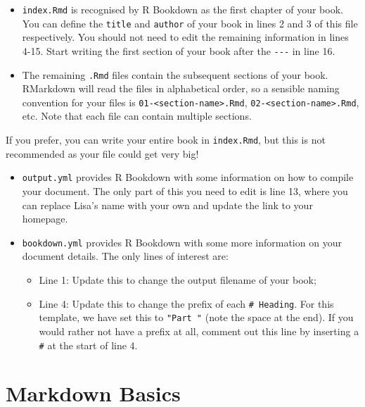 \documentclass[
  letterpaper,
  oneside]{book}
\providecommand{\tightlist}{%
  \setlength{\itemsep}{0pt}\setlength{\parskip}{0pt}}\usepackage{longtable,booktabs,array}
\numberwithin{equation}{section}
\numberwithin{figure}{section}
\theoremstyle{break}
\theoremstyle{plain}
\theoremstyle{remark}
\begin{document}
\begin{itemize}
\item
  \texttt{index.Rmd} is recognised by R Bookdown as the first chapter of
  your book. You can define the \texttt{title} and \texttt{author} of
  your book in lines 2 and 3 of this file respectively. You should not
  need to edit the remaining information in lines 4-15. Start writing
  the first section of your book after the \texttt{-\/-\/-} in line 16.
\item
  The remaining \texttt{.Rmd} files contain the subsequent sections of
  your book. RMarkdown will read the files in alphabetical order, so a
  sensible naming convention for your files is
  \texttt{01-\textless{}section-name\textgreater{}.Rmd},
  \texttt{02-\textless{}section-name\textgreater{}.Rmd}, etc. Note that
  each file can contain multiple sections.
\end{itemize}

If you prefer, you can write your entire book in \texttt{index.Rmd}, but
this is not recommended as your file could get very big!

\begin{itemize}
\item
  \texttt{output.yml} provides R Bookdown with some information on how
  to compile your document. The only part of this you need to edit is
  line 13, where you can replace Lisa's name with your own and update
  the link to your homepage.
\item
  \texttt{bookdown.yml} provides R Bookdown with some more information
  on your document details. The only lines of interest are:

  \begin{itemize}
  \tightlist
  \item
    Line 1: Update this to change the output filename of your book;
  \item
    Line 4: Update this to change the prefix of each
    \texttt{\#\ Heading}. For this template, we have set this to
    \texttt{"Part\ "} (note the space at the end). If you would rather
    not have a prefix at all, comment out this line by inserting a
    \texttt{\#} at the start of line 4.
  \end{itemize}
\end{itemize}

\section{Markdown Basics}\label{markdown-basics}
\end{document}
